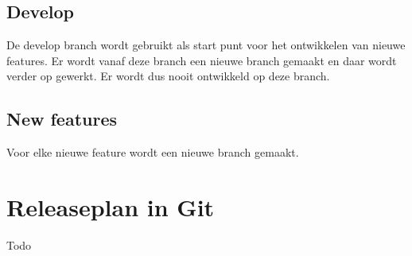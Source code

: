 \documentclass[12pt]{article}
\begin{document}
\subsection{Develop}
De develop branch wordt gebruikt als start punt voor het ontwikkelen van nieuwe features. Er wordt vanaf deze branch een nieuwe branch gemaakt en daar wordt verder op gewerkt. Er wordt dus nooit ontwikkeld op deze branch.
\subsection{New features}
Voor elke nieuwe feature wordt een nieuwe branch gemaakt.

\pagebreak
\section{Releaseplan in Git}
Todo
\end{document}
